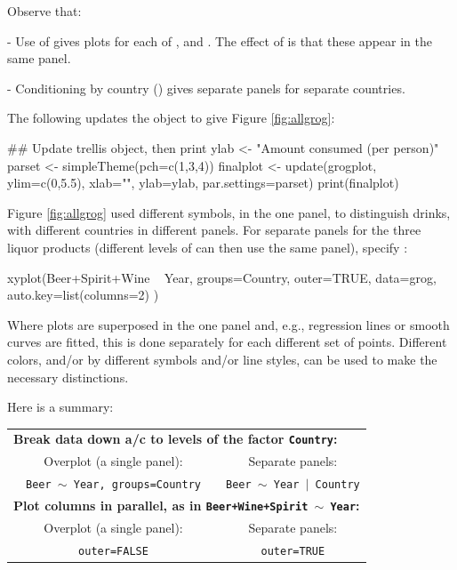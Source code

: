 \pagebreak
\noindent Observe that:
\begin{itemizz}
\item[-] Use of  gives plots for each of
  ,  and .  The effect of
   is that these appear in the same panel.
\item[-] Conditioning by country () gives separate
  panels for separate countries.
\end{itemizz}

The following updates the object to give Figure \ref{fig:allgrog}:
\begin{Schunk}
\begin{Sinput}
## Update trellis object, then print
ylab <- "Amount consumed (per person)"
parset <- simpleTheme(pch=c(1,3,4))
finalplot <- update(grogplot, ylim=c(0,5.5),
                     xlab="", ylab=ylab,
                     par.settings=parset)
print(finalplot)
\end{Sinput}
\end{Schunk}

Figure \ref{fig:allgrog} used different symbols, in the one panel, to
distinguish drinks, with different countries in different panels.
For separate panels for the three liquor products (different levels
of  can then use the same panel), specify :
\begin{Schunk}
\begin{Sinput}
xyplot(Beer+Spirit+Wine ~ Year,
       groups=Country, outer=TRUE,
       data=grog, auto.key=list(columns=2) )
\end{Sinput}
\end{Schunk}

Where plots are superposed in the one panel and, e.g., regression
lines or smooth curves are fitted, this is done separately for each
different set of points.  Different colors, and/or by different
symbols and/or line styles, can be used to make the necessary
distinctions.

Here is a summary:
\vspace*{9pt}

\begin{fullwidth}
\begin{tabular}{lccc}
\multicolumn{4}{l}{\bf Break data down a/c to levels of the
factor \texttt{Country}:}\\[3pt]
& Overplot (a single panel): & & Separate panels: \\
& \texttt{Beer $\sim$ Year, groups=Country} & &
\texttt{Beer $\sim$ Year $\mid$ Country}\\[12pt]
\multicolumn{4}{l}{\bf Plot columns in parallel, as in
\texttt{Beer+Wine+Spirit $\sim$ Year}:}\\[3pt]
& Overplot (a single panel): & & Separate panels: \\
& \texttt{outer=FALSE} & & \texttt{outer=TRUE}\\
\end{tabular}
\end{fullwidth}

